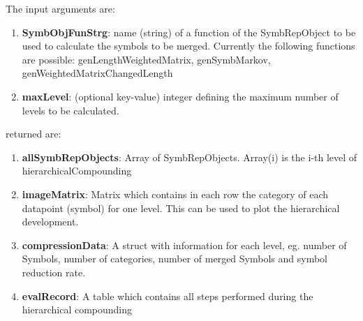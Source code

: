 \documentclass[a4]{scrreprt}
\begin{document}
\begin{enumerate}
		The input arguments are:
		\begin{enumerate}
			\item \textbf{SymbObjFunStrg}: name (string) of a function of the SymbRepObject to be used to calculate the symbols to be merged. Currently the following functions are possible:  genLengthWeightedMatrix, genSymbMarkov, genWeightedMatrixChangedLength
			\item \textbf{maxLevel}: (optional key-value) integer defining the maximum number of levels to be calculated.
		\end{enumerate}
		returned are:
		\begin{enumerate}
			\item \textbf{allSymbRepObjects}: Array of SymbRepObjects. Array(i) is the i-th level of hierarchicalCompounding
			\item \textbf{imageMatrix}: Matrix which contains in each row the category of each datapoint (symbol) for one level. This can be used to plot the hierarchical development.
			\item \textbf{compressionData}: A struct with information for each level, eg. number of Symbols, number of categories, number of merged Symbols and symbol reduction rate.
			\item \textbf{evalRecord}: A table which contains all steps performed during the hierarchical compounding
		\end{enumerate}
	

\end{enumerate}
\end{document}
